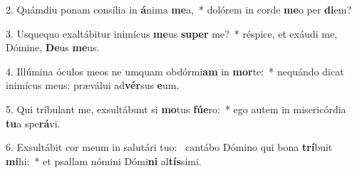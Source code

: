 2. Quámdiu ponam consília in \textbf{á}nima \textbf{me}a,~*  dolórem in corde \textbf{me}o per \textbf{di}em?\

3. Usquequo exaltábitur inimícus \textbf{me}us \textbf{su}\textbf{per} me?~*  réspice, et exáudi me, Dómine, \textbf{De}us \textbf{me}us.\

4. Illúmina óculos meos ne umquam obdórmi\textbf{am} in \textbf{mor}te:~*  nequándo dicat inimícus meus: præválui ad\textbf{vér}sus \textbf{e}um.\

5. Qui tríbulant me, exsultábunt si \textbf{mo}tus \textbf{fú}\textbf{e}ro:~*  ego autem in misericórdia \textbf{tu}a spe\textbf{rá}vi.\

6. Exsultábit cor meum in salutári tuo: \dag\  cantábo Dómino qui bona \textbf{trí}buit \textbf{mi}hi:~*  et psallam nómini Dómi\textbf{ni} al\textbf{tís}simi.\

